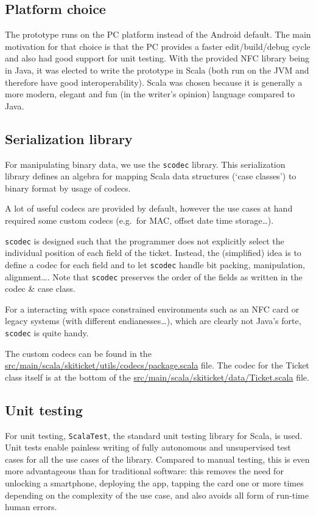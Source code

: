 \documentclass[paper=a4, fontsize=11pt]{scrartcl}
\begin{document}
\subsection{Platform choice}

The prototype runs on the PC platform instead of the Android default.
The main motivation for that choice is that the PC provides a faster
edit/build/debug cycle and also had good support for unit testing.
With the provided NFC library being in Java, it was elected to write the
prototype in Scala (both run on the JVM and therefore have good
interoperability).
Scala was chosen because it is generally a more modern, elegant and fun (in the
writer's opinion) language compared to Java.

\subsection{Serialization library}

For manipulating binary data, we use the \texttt{scodec} library.
This serialization library defines an algebra for mapping Scala data structures
(`case classes') to binary format by usage of codecs. 

A lot of useful codecs are provided by default, however the use cases at hand
required some custom codecs (e.g.\ for MAC, offset date time storage\ldots).

\texttt{scodec} is designed such that the programmer does not explicitly select
the individual position of each field of the ticket. Instead, the (simplified)
idea is to define a codec for each field and to let \texttt{scodec} handle bit
packing, manipulation, alignment\ldots.
Note that \texttt{scodec} preserves the order of the fields as written in the
codec \& case class.

For a interacting with space constrained environments such as an NFC card or
legacy systems (with different endianesses\ldots), which are clearly not Java's
forte, \texttt{scodec} is quite handy.

The custom codecs can be found in the
\url{src/main/scala/skiticket/utils/codecs/package.scala} file.
The codec for the Ticket class itself is at the bottom of the
\url{src/main/scala/skiticket/data/Ticket.scala} file.

\subsection{Unit testing}

For unit testing, \texttt{ScalaTest}, the standard unit testing library for
Scala, is used.
Unit tests enable painless writing of fully autonomous and unsupervised test
cases for all the use cases of the library.
Compared to manual testing, this is even more advantageous than for traditional
software: this removes the need for unlocking a smartphone, deploying the app,
tapping the card one or more times depending on the complexity of the use case,
and also avoids all form of run-time human errors.
\end{document}
